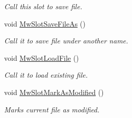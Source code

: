 \begin{DoxyCompactItemize}
\begin{DoxyCompactList}\small\item\em Call this slot to save file. \end{DoxyCompactList}\item 
\mbox{\label{class_main_window_aaadd1a2cd4aec05d23e934a26ee3dbc6}} 
void \hyperlink{class_main_window_aaadd1a2cd4aec05d23e934a26ee3dbc6}{Mw\+Slot\+Save\+File\+As} ()
\begin{DoxyCompactList}\small\item\em Call it to save file under another name. \end{DoxyCompactList}\item 
\mbox{\label{class_main_window_a1a8c873ce09b86ae625f08fc5fdd0552}} 
void \hyperlink{class_main_window_a1a8c873ce09b86ae625f08fc5fdd0552}{Mw\+Slot\+Load\+File} ()
\begin{DoxyCompactList}\small\item\em Call it to load existing file. \end{DoxyCompactList}\item 
\mbox{\label{class_main_window_ad7c825f88ddd5993b000a5dddc145bd3}} 
void \hyperlink{class_main_window_ad7c825f88ddd5993b000a5dddc145bd3}{Mw\+Slot\+Mark\+As\+Modified} ()
\begin{DoxyCompactList}\small\item\em Marks current file as modified. \end{DoxyCompactList}\end{DoxyCompactItemize}
